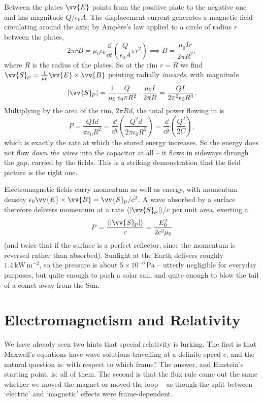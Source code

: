 \begin{example}
	Between the plates $\vv{E}$ points from the positive plate to the negative one and has magnitude $Q/\epsilon_0 A$. The displacement current generates a magnetic field circulating around the axis; by Amp\`ere's law applied to a circle of radius $r$ between the plates,
	$$
	2\pi r B = \mu_0 \epsilon_0 \frac{\dd}{\dd t}\left(\frac{Q}{\epsilon_0 A}\pi r^2\right) \implies B = \frac{\mu_0 I r}{2\pi R^2},
	$$
	where $R$ is the radius of the plates. So at the rim $r = R$ we find $\vv{S}_{\!P} = \frac{1}{\mu_0}\vv{E}\times\vv{B}$ pointing radially \emph{inwards}, with magnitude
	$$
	|\vv{S}_{\!P}| = \frac{1}{\mu_0}\frac{Q}{\epsilon_0 \pi R^2}\cdot\frac{\mu_0 I}{2\pi R} = \frac{QI}{2\pi^2\epsilon_0 R^3}.
	$$
	Multiplying by the area of the rim, $2\pi R d$, the total power flowing in is
	$$
	P = \frac{QId}{\pi \epsilon_0 R^2} = \frac{\dd}{\dd t}\left(\frac{Q^2 d}{2\pi\epsilon_0 R^2}\right) = \frac{\dd}{\dd t}\left(\frac{Q^2}{2C}\right),
	$$
	which is exactly the rate at which the stored energy increases. So the energy does not flow \emph{down the wires} into the capacitor at all -- it flows in sideways through the gap, carried by the fields. This is a striking demonstration that the field picture is the right one.
\end{example}

\begin{remark}
	Electromagnetic fields carry momentum as well as energy, with momentum density $\epsilon_0 \vv{E}\times\vv{B} = \vv{S}_{\!P}/c^2$. A wave absorbed by a surface therefore delivers momentum at a rate $\langle|\vv{S}_{\!P}|\rangle/c$ per unit area, exerting a 
	$$
	P = \frac{\langle|\vv{S}_{\!P}|\rangle}{c} = \frac{E_0^2}{2c^2\mu_0}
	$$
	(and twice that if the surface is a perfect reflector, since the momentum is reversed rather than absorbed). Sunlight at the Earth delivers roughly $1.4\,\mathrm{kW}\,\mathrm{m}^{-2}$, so the pressure is about $5\times 10^{-6}\,\mathrm{Pa}$ -- utterly negligible for everyday purposes, but quite enough to push a solar sail, and quite enough to blow the tail of a comet away from the Sun.
\end{remark}

\section{Electromagnetism and Relativity}
\label{sec:relativity}

We have already seen two hints that special relativity is lurking. The first is that Maxwell's equations have wave solutions travelling at a definite speed $c$, and the natural question is: with respect to which frame? The answer, and Einstein's starting point, is: all of them. The second is that the flux rule came out the same whether we moved the magnet or moved the loop -- as though the split between `electric' and `magnetic' effects were frame-dependent.

